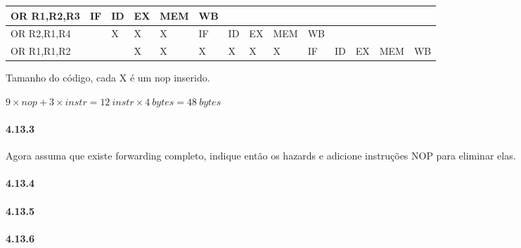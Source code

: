 \documentclass{article}
\begin{document}
\begin{tabular}{|l|l|l|l|l|l|l|l|l|l|l|l|l|l|}
  \hline OR R1,R2,R3 & IF& ID& EX& MEM&  WB&   &   &    &    &   &   &    &   \\
  \hline OR R2,R1,R4 &   &  X&  X&   X&  IF& ID& EX& MEM&  WB&   &   &    &   \\
  \hline OR R1,R1,R2 &   &   &  X&   X&   X&  X&  X&   X&  IF& ID& EX& MEM& WB\\
  \hline
\end{tabular}

Tamanho do código, cada X é um nop inserido.

$9 \times nop + 3 \times instr = 12\ instr \times 4\ bytes = 48\ bytes$

\paragraph{4.13.3} Agora assuma que existe forwarding completo, indique então os
hazards e adicione instruções NOP para eliminar elas.



\paragraph{4.13.4}

\paragraph{4.13.5}

\paragraph{4.13.6}
\end{document}

